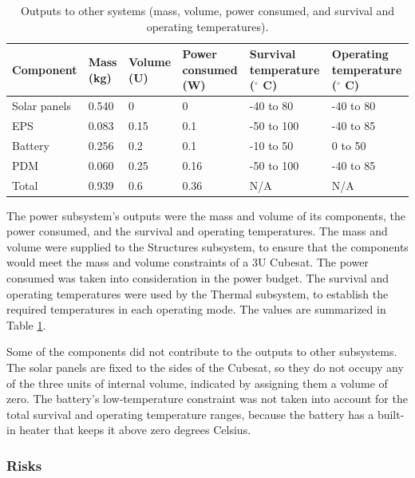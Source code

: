 \documentclass[12pt]{article}
\begin{document}
			

\begin{table}[ht]
\caption{Outputs to other systems (mass, volume, power consumed, and survival and operating temperatures).\cite[p.~9]{EPS-manual}\cite[p.~11,~21]{PDM-manual}\cite[p.~9]{Battery-manual}\cite[p.~2]{Solar-panel-datasheet}}
\label{tab:power-outputs}
\begin{center}
    \begin{tabular}{|l|l|l|p{0.8in}|p{1in}|p{1.1in}|} \hline
Component & Mass (kg) & Volume (U) & Power consumed (W) & Survival temperature ($^\circ$ C) & Operating temperature ($^\circ$ C) \\ \hline \hline
Solar panels & 0.540 & 0 & 0 & -40 to 80 & -40 to 80 \\\hline
EPS & 0.083 & 0.15 & 0.1 & -50 to 100 & -40 to 85 \\\hline
Battery & 0.256 & 0.2 & 0.1 & -10 to 50 & 0 to 50 \\\hline
PDM & 0.060 & 0.25 & 0.16 & -50 to 100 & -40 to 85 \\\hline \hline
Total & 0.939 & 0.6 & 0.36 & N/A & N/A \\\hline
    \end{tabular}
\end{center}
\end{table}

The power subsystem's outputs were the mass and volume of its components, the power consumed, and the survival and operating temperatures.  The mass and volume were supplied to the Structures subsystem, to ensure that the components would meet the mass and volume constraints of a 3U Cubesat.  The power consumed was taken into consideration in the power budget.  The survival and operating temperatures were used by the Thermal subsystem, to establish the required temperatures in each operating mode.  The values are summarized in Table \ref{tab:power-outputs}.

Some of the components did not contribute to the outputs to other subsystems.  The solar panels are fixed to the sides of the Cubesat, so they do not occupy any of the three units of internal volume, indicated by assigning them a volume of zero.  The battery's low-temperature constraint was not taken into account for the total survival and operating temperature ranges, because the battery has a built-in heater that keeps it above zero degrees Celsius.\cite[p.~12]{Battery-manual}

			\subsubsection{Risks}
\end{document}
